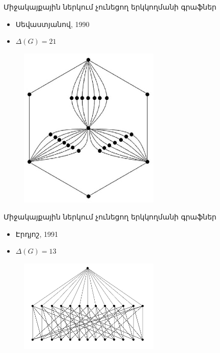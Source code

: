 \begin{frame}{Միջակայքային ներկում չունեցող երկկողմանի գրաֆներ}
\begin{itemize}
\item Սեվաստյանով, 1990
\item $\Delta(G)=21$
\end{itemize}

\begin{figure}[h]
\begin{center}
\includegraphics[width=0.6\textwidth]{figures/sevastyanov.eps}
\end{center}
\end{figure}
\end{frame}


\begin{frame}{Միջակայքային ներկում չունեցող երկկողմանի գրաֆներ}
\begin{itemize}
\item Էրդյոշ, 1991
\item $\Delta(G)=13$
\end{itemize}

\begin{figure}[h]
\begin{center}
\includegraphics[width=0.6\textwidth]{figures/erd13.jpg}
\end{center}
\end{figure}
\end{frame}

